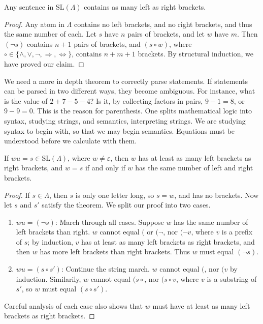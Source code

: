 \begin{theorem}
    Any sentence in $\text{SL}(\Lambda)$ contains as many left as right brackets.
\end{theorem}
\begin{proof}
    Any atom in $\Lambda$ contains no left brackets, and no right brackets, and thus the same number of each. Let $s$ have $n$ pairs of brackets, and let $w$ have $m$. Then $(\neg s)$ contains $n + 1$ pairs of brackets, and $(s \circ w)$, where $\circ \in \{ \wedge, \vee, \neg, \Rightarrow, \Leftrightarrow \}$, contains $n + m + 1$ brackets. By structural induction, we have proved our claim.
\end{proof}

We need a more in depth theorem to correctly parse statements. If statements can be parsed in two different ways, they become ambiguous. For instance, what is the value of $2 + 7 - 5 - 4$? Is it, by collecting factors in pairs, $9 - 1 = 8$, or $9 - 9 = 0$. This is the reason for parenthesis. One splits mathematical logic into syntax, studying strings, and semantics, interpreting strings. We are studying syntax to begin with, so that we may begin semantics. Equations must be understood before we calculate with them.

\begin{theorem}
    If $wu = s \in \text{SL}(\Lambda)$, where $w \neq \varepsilon$, then $w$ has at least as many left brackets as right brackets, and $w = s$ if and only if $w$ has the same number of left and right brackets.
\end{theorem}
\begin{proof}
    If $s \in \Lambda$, then $s$ is only one letter long, so $s = w$, and has no brackets. Now let $s$ and $s'$ satisfy the theorem. We split our proof into two cases.
    \begin{enumerate}
        \item $wu = (\neg s)$: March through all cases. Suppose $w$ has the same number of left brackets than right. $w$ cannot equal $($ or $(\neg$, nor $(\neg v$, where $v$ is a prefix of $s$; by induction, $v$ has at least as many left brackets as right brackets, and then $w$ has more left brackets than right brackets. Thus $w$ must equal $(\neg s)$.
        \item $wu = (s \circ s')$: Continue the string march. $w$ cannot equal $($, nor $(v$ by induction. Similarily, $w$ cannot equal $(s \circ$, nor $(s \circ v$, where $v$ is a substring of $s'$, so $w$ must equal $(s \circ s')$.
    \end{enumerate}
    Careful analysis of each case also shows that $w$ must have at least as many left brackets as right brackets.
\end{proof}

